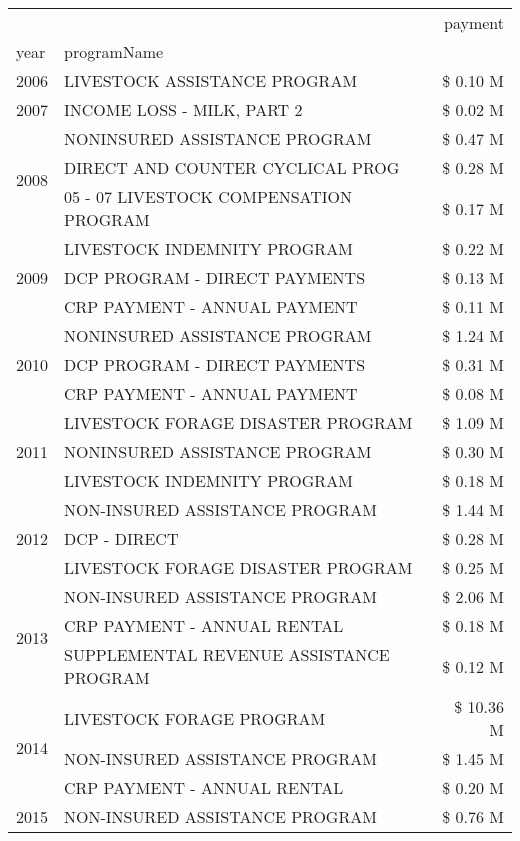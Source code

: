 \begin{tabular}{llr}
\toprule
 &  & payment \\
year & programName &  \\
\midrule
2006 & LIVESTOCK ASSISTANCE PROGRAM & \$ 0.10 M \\
\cline{1-3}
2007 & INCOME LOSS - MILK, PART 2 & \$ 0.02 M \\
\cline{1-3}
\multirow[t]{3}{*}{2008} & NONINSURED ASSISTANCE PROGRAM & \$ 0.47 M \\
 & DIRECT AND COUNTER CYCLICAL PROG & \$ 0.28 M \\
 & 05 - 07 LIVESTOCK COMPENSATION PROGRAM & \$ 0.17 M \\
\cline{1-3}
\multirow[t]{3}{*}{2009} & LIVESTOCK INDEMNITY PROGRAM & \$ 0.22 M \\
 & DCP PROGRAM - DIRECT PAYMENTS & \$ 0.13 M \\
 & CRP PAYMENT - ANNUAL PAYMENT & \$ 0.11 M \\
\cline{1-3}
\multirow[t]{3}{*}{2010} & NONINSURED ASSISTANCE PROGRAM & \$ 1.24 M \\
 & DCP PROGRAM - DIRECT PAYMENTS & \$ 0.31 M \\
 & CRP PAYMENT - ANNUAL PAYMENT & \$ 0.08 M \\
\cline{1-3}
\multirow[t]{3}{*}{2011} & LIVESTOCK FORAGE DISASTER PROGRAM & \$ 1.09 M \\
 & NONINSURED ASSISTANCE PROGRAM & \$ 0.30 M \\
 & LIVESTOCK INDEMNITY PROGRAM & \$ 0.18 M \\
\cline{1-3}
\multirow[t]{3}{*}{2012} & NON-INSURED ASSISTANCE PROGRAM & \$ 1.44 M \\
 & DCP - DIRECT & \$ 0.28 M \\
 & LIVESTOCK FORAGE DISASTER PROGRAM & \$ 0.25 M \\
\cline{1-3}
\multirow[t]{3}{*}{2013} & NON-INSURED ASSISTANCE PROGRAM & \$ 2.06 M \\
 & CRP PAYMENT - ANNUAL RENTAL & \$ 0.18 M \\
 & SUPPLEMENTAL REVENUE ASSISTANCE PROGRAM & \$ 0.12 M \\
\cline{1-3}
\multirow[t]{3}{*}{2014} & LIVESTOCK FORAGE PROGRAM & \$ 10.36 M \\
 & NON-INSURED ASSISTANCE PROGRAM & \$ 1.45 M \\
 & CRP PAYMENT - ANNUAL RENTAL & \$ 0.20 M \\
\cline{1-3}
\multirow[t]{3}{*}{2015} & NON-INSURED ASSISTANCE PROGRAM & \$ 0.76 M \\

\end{tabular}

